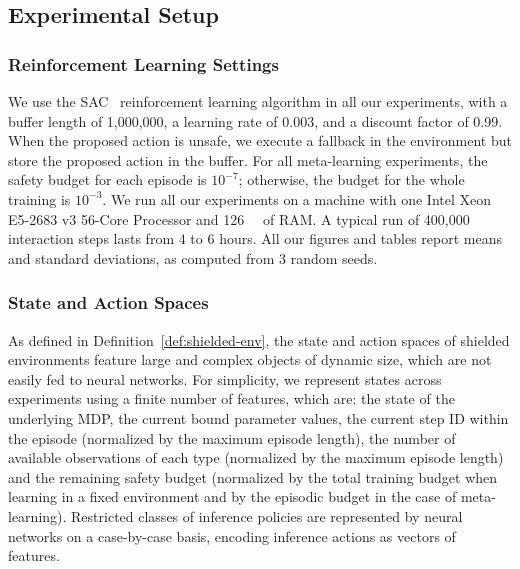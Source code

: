 \subsection{Experimental Setup}

\subsubsection{Reinforcement Learning Settings} We use the SAC~\cite{haarnoja2018soft} reinforcement learning algorithm in all our experiments, with a buffer length of 1,000,000, a learning rate of 0.003, and a discount factor of 0.99. When the proposed action is unsafe, we execute a fallback in the environment but store the proposed action in the buffer. For all meta-learning experiments, the safety budget for each episode is $10^{-7}$; otherwise, the budget for the whole training is $10^{-3}$. We run all our experiments on a machine with one Intel Xeon E5-2683 v3 56-Core Processor and \qty{126}{\giga\byte} of RAM. A typical run of 400,000 interaction steps lasts from $4$ to $6$ hours. All our figures and tables report means and standard deviations, as computed from 3 random seeds.

\subsubsection{State and Action Spaces} As defined in Definition~\ref{def:shielded-env}, the state and action spaces of shielded environments feature large and complex objects of dynamic size, which are not easily fed to neural networks. For simplicity, we represent states across experiments using a finite number of features, which are: the state of the underlying MDP, the current bound parameter values, the current step ID within the episode (normalized by the maximum episode length), the number of available observations of each type (normalized by the maximum episode length) and the remaining safety budget (normalized by the total training budget when learning in a fixed environment and by the episodic budget in the case of meta-learning). Restricted classes of inference policies are represented by neural networks on a case-by-case basis, encoding inference actions as vectors of features.





